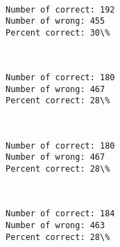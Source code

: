 \documentclass[11pt]{article}
\begin{document}
    \begin{center}
    \end{center}
    { \hspace*{\fill} \\}
    
    \begin{Verbatim}[commandchars=\\\{\}]
Number of correct: 192
Number of wrong: 455
Percent correct: 30\%

    \end{Verbatim}

    \begin{center}
    \end{center}
    { \hspace*{\fill} \\}
    
    \begin{Verbatim}[commandchars=\\\{\}]
Number of correct: 180
Number of wrong: 467
Percent correct: 28\%

    \end{Verbatim}

    \begin{center}
    \end{center}
    { \hspace*{\fill} \\}
    
    \begin{Verbatim}[commandchars=\\\{\}]
Number of correct: 180
Number of wrong: 467
Percent correct: 28\%

    \end{Verbatim}

    \begin{center}
    \end{center}
    { \hspace*{\fill} \\}
    
    \begin{Verbatim}[commandchars=\\\{\}]
Number of correct: 184
Number of wrong: 463
Percent correct: 28\%

    \end{Verbatim}
\end{document}
